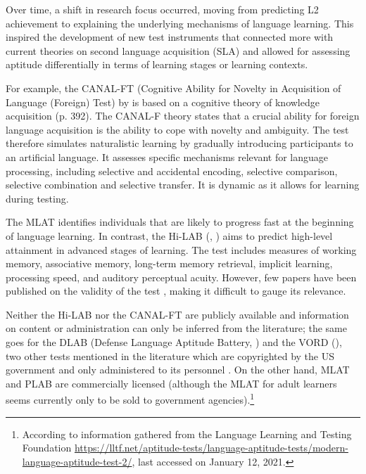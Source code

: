 \documentclass[output=paper]{langscibook}
\begin{document}
\begin{sloppypar}
Over time, a shift in research focus occurred, moving from predicting L2 achievement to explaining the underlying mechanisms of language learning. This inspired the development of new test instruments that connected more with current theories on second language acquisition (SLA) and allowed for assessing aptitude differentially in terms of learning stages or learning contexts. 
\end{sloppypar}

For example, the CANAL-FT (Cognitive Ability for Novelty in Acquisition of Language (Foreign) Test) by \citet{GrigorenkoEtAl2000} is based on a cognitive theory of knowledge acquisition (p. 392). The CANAL-F theory states that a crucial ability for foreign language acquisition is the ability to cope with novelty and ambiguity. The test therefore simulates naturalistic learning by gradually introducing participants to an artificial language. It assesses specific mechanisms relevant for language processing, including selective and accidental encoding, selective comparison, selective combination and selective transfer. It is dynamic as it allows for learning during testing. 

The MLAT identifies individuals that are likely to progress fast at the beginning of language learning. In contrast, the Hi-LAB (\citealt{DoughtyEtAl2010}, \citealt{LinckEtAl2013}) aims to predict high-level attainment in advanced stages of learning. The test includes measures of working memory, associative memory, long-term memory retrieval, implicit learning, processing speed, and auditory perceptual acuity. However, few papers have been published on the validity of the test \citep{LinckEtAl2013}, making it difficult to gauge its relevance. 

Neither the Hi-LAB nor the CANAL-FT are publicly available and information on content or administration can only be inferred from the literature; the same goes for the DLAB (Defense Language Aptitude Battery, \citealt{PetersenAlHaik1976}) and the VORD (\citealt{ParryChild1990}), two other tests mentioned in the literature which are copyrighted by the US government and only administered to its personnel \citep{Robinson2002}. On the other hand, MLAT and PLAB are commercially licensed (although the MLAT for adult learners seems currently only to be sold to government agencies).\footnote{According to information gathered from the Language Learning and Testing Foundation \url{https://lltf.net/aptitude-tests/language-aptitude-tests/modern-language-aptitude-test-2/}, last accessed on January 12, 2021.}
\end{document}
